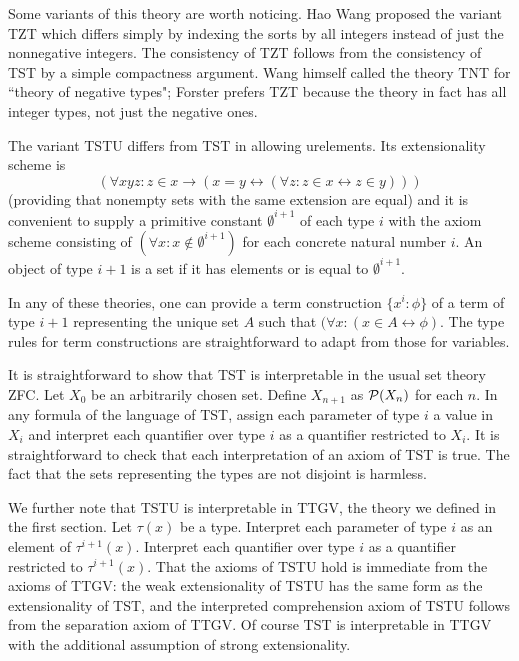 \documentclass[12pt]{article}
\begin{document}
Some variants of this theory are worth noticing.  Hao Wang proposed the variant TZT which differs simply by indexing the sorts by all integers instead of just the nonnegative integers.  The consistency of TZT follows from the consistency of TST by a simple compactness argument.  Wang himself called the theory TNT for ``theory of negative types";  Forster prefers TZT because the theory in fact has all integer types, not just the negative ones.

The variant TSTU differs from TST in allowing urelements.  Its extensionality scheme is $$(\forall xyz:z\in x \rightarrow(x=y \leftrightarrow (\forall z:z\in x \leftrightarrow z \in y)))$$ (providing that nonempty sets with the same extension are equal) and it is convenient to supply a primitive constant $\emptyset^{i+1}$ of each type $i$ with the axiom scheme consisting of $(\forall x:x \not\in \emptyset^{i+1})$ for each concrete natural number $i$.  An object of type $i+1$ is a set if it has elements or is equal to $\emptyset^{i+1}$.

In any of these theories, one can provide a term construction $\{x^i:\phi\}$ of a term of type $i+1$ representing the unique set $A$ such that $(\forall x:(x \in A \leftrightarrow \phi)$.  The type rules for term constructions are straightforward to adapt from those for variables.

It is straightforward to show that TST is interpretable in the usual set theory ZFC.  Let $X_0$ be an arbitrarily chosen set. Define $X_{n+1}$ as ${\cal P}(X_n)$ for each $n$.  In any formula of the language of TST, assign each parameter
of type $i$ a value in $X_i$ and interpret each quantifier over type $i$ as a quantifier restricted to $X_i$.  It is straightforward to check that each interpretation of an axiom of TST is true.   The fact that the sets representing the types are not disjoint is harmless.

We further note that TSTU is interpretable in TTGV, the theory we defined in the first section.  Let $\tau(x)$ be a type.  Interpret each parameter of type $i$ as an element of $\tau^{i+1}(x)$.  Interpret each quantifier over type $i$ as a quantifier restricted to $\tau^{i+1}(x)$.  That the axioms of TSTU hold is immediate from the axioms of TTGV:  the weak extensionality of TSTU has the same form as the extensionality of TST, and the interpreted comprehension axiom of TSTU follows from
the separation axiom of TTGV.  Of course TST is interpretable in TTGV with the additional assumption of strong extensionality.
\end{document}
